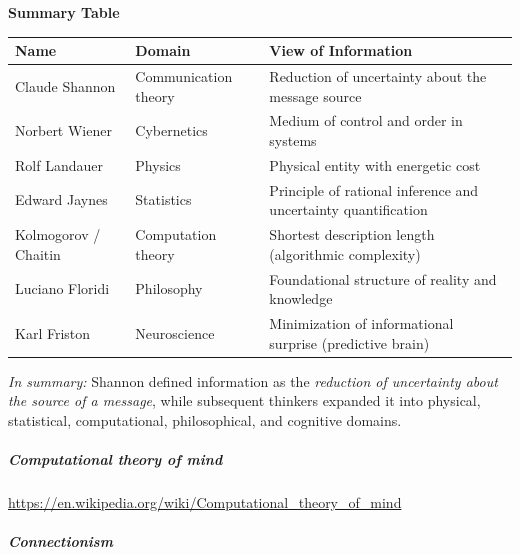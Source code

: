 \documentclass{book}
\providecommand{\ProjectDeepHeading}[2]{%
    \par\medskip\noindent\textbf{#2}\par\smallskip
}
\begin{document}
    \ProjectDeepHeading{3}{Summary Table}
        
        \begin{center}
            \begin{tabular}{|l|l|p{8cm}|}
                \hline
                \textbf{Name}        & \textbf{Domain}      & \textbf{View of Information}                                   \\
                \hline
                Claude Shannon       & Communication theory & Reduction of uncertainty about the message source              \\
                Norbert Wiener       & Cybernetics          & Medium of control and order in systems                         \\
                Rolf Landauer        & Physics              & Physical entity with energetic cost                            \\
                Edward Jaynes        & Statistics           & Principle of rational inference and uncertainty quantification \\
                Kolmogorov / Chaitin & Computation theory   & Shortest description length (algorithmic complexity)           \\
                Luciano Floridi      & Philosophy           & Foundational structure of reality and knowledge                \\
                Karl Friston         & Neuroscience         & Minimization of informational surprise (predictive brain)      \\
                \hline
            \end{tabular}
        \end{center}
        
        \bigskip
        \textit{In summary:}
        Shannon defined information as the \emph{reduction of uncertainty about the source of a message},
        while subsequent thinkers expanded it into physical, statistical, computational, philosophical, and cognitive domains.

\subparagraph{Computational theory of mind}


\url{https://en.wikipedia.org/wiki/Computational_theory_of_mind}

\subparagraph{Connectionism}

\end{document}

